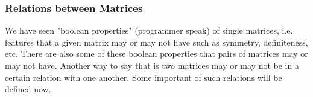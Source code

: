 



\subsubsection{Relations between Matrices}
We have seen "boolean properties" (programmer speak) of single matrices, i.e. features that a given matrix may or may not have such as symmetry, definiteness, etc. There are also some of these boolean properties that pairs of matrices may or may not have. Another way to say that is two matrices may or may not be in a certain relation with one another. Some important of such relations will be defined now.


